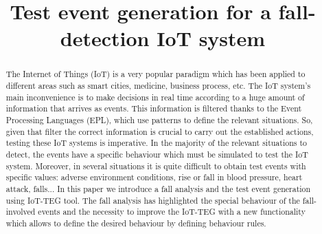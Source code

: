 \documentclass[conference]{IEEEtran}
\theoremstyle{definition}
\begin{document}
%
\title{Test event generation for a fall-detection IoT system}


\author{
\and
{}
}

\maketitle

\begin{abstract}
The Internet of Things (IoT) is a very popular paradigm which has been applied to different areas 
such as smart cities, medicine, business process, etc. The IoT system's main inconvenience is to make
decisions in real time according to a huge amount of information that arrives as events. This information
is filtered thanks to the Event Processing Languages (EPL), which use patterns to define the relevant situations.
So, given that filter the correct information is crucial to carry out the established actions, testing these
IoT systems is imperative.
In the majority of the relevant situations to detect, the events have a specific behaviour which must
be simulated to test the IoT system. Moreover, in several situations it is quite difficult to obtain test events with
specific values: adverse environment conditions, rise or fall in blood pressure, heart attack, falls... 
In this paper we introduce a fall analysis and the test event generation using IoT-TEG tool. The fall analysis
has highlighted the special behaviour of the fall-involved events and the necessity to improve the IoT-TEG with
a new functionality which allows to define the desired behaviour by defining behaviour rules.
\end{abstract}
\end{document}
